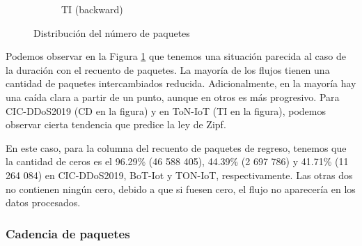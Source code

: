 \begin{figure}[H]
\begin{subfigure}[b]{0.26\textwidth}
        \caption{TI (backward)}
    \end{subfigure}
    \hfill
       \caption{Distribución del número de paquetes}
       \label{fig:packet_pincer_packet_count}
\end{figure}

Podemos observar en la Figura \ref{fig:packet_pincer_packet_count} que tenemos una situación parecida al caso de la duración con el recuento de paquetes. La mayoría de los flujos tienen una cantidad de paquetes intercambiados reducida. Adicionalmente, en la mayoría hay una caída clara a partir de un punto, aunque en otros es más progresivo. Para CIC-DDoS2019 (CD en la figura) y en ToN-IoT (TI en la figura), podemos observar cierta tendencia que predice la ley de Zipf.

En este caso, para la columna del recuento de paquetes de regreso, tenemos que la cantidad de ceros es el 96.29\% (46 588 405), 44.39\% (2 697 786) y 41.71\% (11 264 084) en CIC-DDoS2019, BoT-Iot y TON-IoT, respectivamente. Las otras dos no contienen ningún cero, debido a que si fuesen cero, el flujo no aparecería en los datos procesados.

\subsubsection{Cadencia de paquetes}

